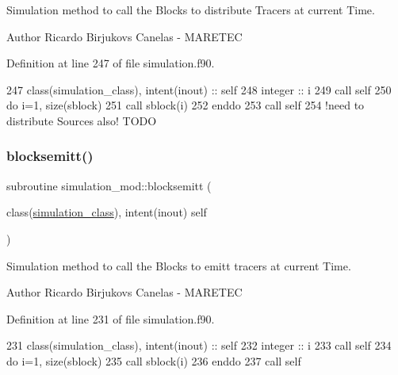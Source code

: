 Simulation method to call the Blocks to distribute Tracers at current Time. 

\begin{DoxyAuthor}{Author}
Ricardo Birjukovs Canelas -\/ M\+A\+R\+E\+T\+EC 
\end{DoxyAuthor}


Definition at line 247 of file simulation.\+f90.


\begin{DoxyCode}
247     \textcolor{keywordtype}{class}(simulation\_class), \textcolor{keywordtype}{intent(inout)} :: self
248     \textcolor{keywordtype}{integer} :: i
249     \textcolor{keyword}{call }self%
250     \textcolor{keywordflow}{do} i=1, \textcolor{keyword}{size}(sblock)
251         \textcolor{keyword}{call }sblock(i)%
252 \textcolor{keywordflow}{    enddo}
253     \textcolor{keyword}{call }self%
254     \textcolor{comment}{!need to distribute Sources also! TODO}
\end{DoxyCode}
\mbox{\label{namespacesimulation__mod_a13aa0745f4601e3f418143dab2f18276}} 
\subsubsection{\texorpdfstring{blocksemitt()}{blocksemitt()}}
{\footnotesize\ttfamily subroutine simulation\+\_\+mod\+::blocksemitt (\begin{DoxyParamCaption}\item[{class(\mbox{\hyperlink{structsimulation__mod_1_1simulation__class}{simulation\+\_\+class}}), intent(inout)}]{self }\end{DoxyParamCaption})\hspace{0.3cm}{\ttfamily [private]}}



Simulation method to call the Blocks to emitt tracers at current Time. 

\begin{DoxyAuthor}{Author}
Ricardo Birjukovs Canelas -\/ M\+A\+R\+E\+T\+EC 
\end{DoxyAuthor}


Definition at line 231 of file simulation.\+f90.


\begin{DoxyCode}
231     \textcolor{keywordtype}{class}(simulation\_class), \textcolor{keywordtype}{intent(inout)} :: self
232     \textcolor{keywordtype}{integer} :: i
233     \textcolor{keyword}{call }self%
234     \textcolor{keywordflow}{do} i=1, \textcolor{keyword}{size}(sblock)
235         \textcolor{keyword}{call }sblock(i)%
236 \textcolor{keywordflow}{    enddo}
237     \textcolor{keyword}{call }self%
\end{DoxyCode}
\mbox{\label{namespacesimulation__mod_ab2e7a1b0f131ab6fe40454d32cb3e24f}} 
